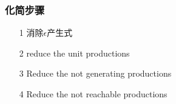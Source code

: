 \documentclass[../main.tex]{subfiles}
\begin{document}
\subsubsection{化简步骤}

\begin{enumerate}
\item [1]  消除\(\epsilon\)产生式
\item [2]  reduce the unit productions
\item [3] Reduce the not generating productions
\item [4] Reduce the not reachable productions
\end{enumerate}

\end{document}
